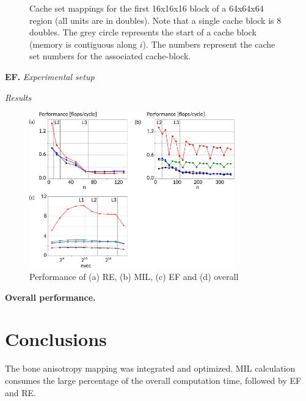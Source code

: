 \documentclass[letterpaper]{article}
\newcommand{\mypar}[1]{{\bf #1.}}
\newcommand\inputpgf[2]{{
\let\pgfimageWithoutPath\pgfimage
\renewcommand{\pgfimage}[2][]{\pgfimageWithoutPath[##1]{#1/##2}}

}}
\begin{document}
\begin{figure}[H]
  \inputpgf{figs/conflict_miss}{mil_blocking_conflicts_64.pgf}\vspace{-1cm}
  \caption{Cache set mappings for the first 16x16x16 block of a 64x64x64 region (all units are in doubles). Note that a single cache block is 8 doubles. The grey circle represents the start of a cache block (memory is contiguous along $i$). The numbers represent the cache set numbers for the associated cache-block. }
  \label{res:conflict_miss_64}
\end{figure}

\mypar{EF} \textit{Experimental setup}

\textit{Results}
 
\begin{figure}[H]
  \centering \includegraphics[width=3.5in]{figs/plots/overall/overall_performance.pdf}
  \caption{Performance of (a) RE, (b) MIL, (c) EF and (d) overall}
  \label{res:overall}
\end{figure}


\mypar{Overall performance}

\section{Conclusions}

The bone anisotropy mapping was integrated and optimized. MIL calculation consumes the large percentage of the overall computation time, followed by EF and RE. 
\end{document}
